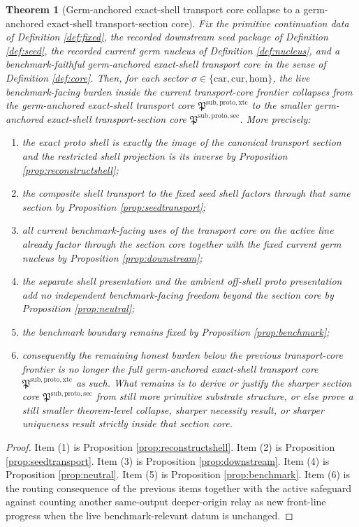 \documentclass[11pt]{article}
\newcommand{\Car}{\mathrm{car}}
\newcommand{\Cur}{\mathrm{cur}}
\newcommand{\Hom}{\mathrm{hom}}
\newcommand{\ProtoTransportCore}{\mathfrak P^{\mathrm{sub,proto,xtc}}}
\newcommand{\ProtoSectionCore}{\mathfrak P^{\mathrm{sub,proto,sec}}}
\newtheorem{theorem}{Theorem}
\begin{document}
\begin{theorem}[Germ-anchored exact-shell transport core collapse to a germ-anchored exact-shell transport-section core]
\label{thm:main}
Fix the primitive continuation data of Definition \ref{def:fixed}, the recorded downstream seed package of Definition \ref{def:seed}, the recorded current germ nucleus of Definition \ref{def:nucleus}, and a benchmark-faithful germ-anchored exact-shell transport core in the sense of Definition \ref{def:core}. Then, for each sector \(\sigma\in\{\Car,\Cur,\Hom\}\), the live benchmark-facing burden inside the current transport-core frontier collapses from the germ-anchored exact-shell transport core \(\ProtoTransportCore\) to the smaller germ-anchored exact-shell transport-section core \(\ProtoSectionCore\). More precisely:
\begin{enumerate}
    \item the exact proto shell is exactly the image of the canonical transport section and the restricted shell projection is its inverse by Proposition \ref{prop:reconstructshell};
    \item the composite shell transport to the fixed seed shell factors through that same section by Proposition \ref{prop:seedtransport};
    \item all current benchmark-facing uses of the transport core on the active line already factor through the section core together with the fixed current germ nucleus by Proposition \ref{prop:downstream};
    \item the separate shell presentation and the ambient off-shell proto presentation add no independent benchmark-facing freedom beyond the section core by Proposition \ref{prop:neutral};
    \item the benchmark boundary remains fixed by Proposition \ref{prop:benchmark};
    \item consequently the remaining honest burden below the previous transport-core frontier is no longer the full germ-anchored exact-shell transport core \(\ProtoTransportCore\) as such. What remains is to derive or justify the sharper section core \(\ProtoSectionCore\) from still more primitive substrate structure, or else prove a still smaller theorem-level collapse, sharper necessity result, or sharper uniqueness result strictly inside that section core.
\end{enumerate}
\end{theorem}

\begin{proof}
Item (1) is Proposition \ref{prop:reconstructshell}. Item (2) is Proposition \ref{prop:seedtransport}. Item (3) is Proposition \ref{prop:downstream}. Item (4) is Proposition \ref{prop:neutral}. Item (5) is Proposition \ref{prop:benchmark}. Item (6) is the routing consequence of the previous items together with the active safeguard against counting another same-output deeper-origin relay as new front-line progress when the live benchmark-relevant datum is unchanged.
\end{proof}
\end{document}
